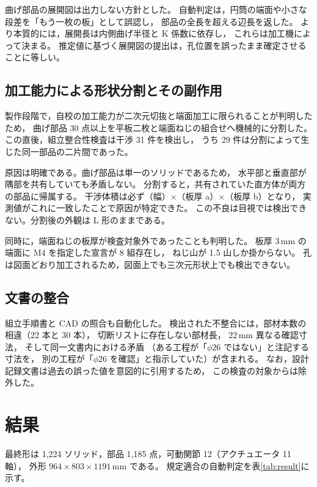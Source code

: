 \documentclass[a4paper,10pt,twocolumn]{ltjsarticle}
\newcommand{\mm}{\ensuremath{\,\mathrm{mm}}}
\begin{document}
曲げ部品の展開図は出力しない方針とした。
自動判定は，円筒の端面や小さな段差を「もう一枚の板」として誤認し，
部品の全長を超える辺長を返した。
より本質的には，展開長は内側曲げ半径と K 係数に依存し，
これらは加工機によって決まる。
推定値に基づく展開図の提出は，孔位置を誤ったまま確定させることに等しい。

\subsection{加工能力による形状分割とその副作用}

製作段階で，自校の加工能力が二次元切抜と端面加工に限られることが判明したため，
曲げ部品 30 点以上を平板二枚と端面ねじの組合せへ機械的に分割した。
この直後，組立整合性検査は干渉 31 件を検出し，
うち 29 件は分割によって生じた同一部品の二片間であった。

原因は明確である。曲げ部品は単一のソリッドであるため，
水平部と垂直部が隅部を共有していても矛盾しない。
分割すると，共有されていた直方体が両方の部品に帰属する。
干渉体積は必ず（幅）$\times$（板厚 a）$\times$（板厚 b）となり，
実測値がこれに一致したことで原因が特定できた。
この不良は目視では検出できない。分割後の外観は L 形のままである。

同時に，端面ねじの板厚が検査対象外であったことも判明した。
板厚 $3\mm$ の端面に M4 を指定した宣言が 8 組存在し，
ねじ山が 1.5 山しか掛からない。
孔は図面どおり加工されるため，図面上でも三次元形状上でも検出できない。

\subsection{文書の整合}

組立手順書と CAD の照合も自動化した。
検出された不整合には，部材本数の相違（22 本と 30 本），
切断リストに存在しない部材長，
$22\mm$ 異なる確認寸法，
そして同一文書内における矛盾
（ある工程が「$\phi26$ ではない」と注記する寸法を，
別の工程が「$\phi26$ を確認」と指示していた）が含まれる。
なお，設計記録文書は過去の誤った値を意図的に引用するため，
この検査の対象からは除外した。

\section{結果}

最終形は 1{,}224 ソリッド，部品 1{,}185 点，可動関節 12（アクチュエータ 11 軸），
外形 $964\times803\times1191\mm$ である。
規定適合の自動判定を表\ref{tab:result}に示す。
\end{document}

